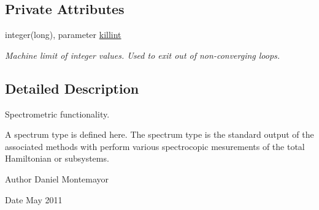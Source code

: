 \subsection*{Private Attributes}
\begin{DoxyCompactItemize}
\item 
integer(long), parameter \hyperlink{classspectrometer__class_a5564f6a94902c50fefd03dd3f5ec4e47}{killint}
\begin{DoxyCompactList}\small\item\em Machine limit of integer values. Used to exit out of non-\/converging loops. \end{DoxyCompactList}\end{DoxyCompactItemize}


\subsection{Detailed Description}
Spectrometric functionality. 

A spectrum type is defined here. The spectrum type is the standard output of the associated methods with perform various spectrocopic mesurements of the total Hamiltonian or subsystems. \begin{DoxyAuthor}{Author}
Daniel Montemayor 
\end{DoxyAuthor}
\begin{DoxyDate}{Date}
May 2011 
\end{DoxyDate}


